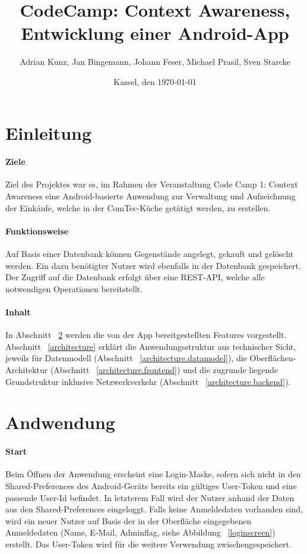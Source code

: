 \documentclass{scrartcl}
\begin{document}
	\title{CodeCamp: Context Awareness, Entwicklung einer Android-App}
	\author{Adrian Kunz, Jan Bingemann, Johann Feser, Michael Prasil, Sven Starcke}
	\date{Kassel, den \today}
	
	\maketitle
	\vspace*{10ex}
	\tableofcontents
	
	\newpage
	
	\section{Einleitung}
		\paragraph*{Ziele}
		Ziel des Projektes war es, im Rahmen der Veranstaltung \glqq Code Camp 1: Context Awareness\grqq{} eine Android-basierte Anwendung zur Verwaltung und Aufzeichnung der Einkäufe, welche in der ComTec-Küche getätigt werden, zu erstellen.
		
		\paragraph*{Funktionsweise}
		Auf Basis einer Datenbank können Gegenstände angelegt, gekauft und gelöscht werden. Ein dazu benötigter Nutzer wird ebenfalls in der Datenbank gespeichert. Der Zugriff auf die Datenbank erfolgt über eine REST-API, welche alle notwendigen Operationen bereitstellt.
		
		\paragraph*{Inhalt}
		In Abschnitt ~\ref{features} werden die von der App bereitgestellten Features vorgestellt. Abschnitt ~\ref{architecture} erklärt die Anwendungsstruktur aus technischer Sicht, jeweils für Datenmodell (Abschnitt ~\ref{architecture.datamodel}), die Oberflächen-Architektur (Abschnitt ~\ref{architecture.frontend}) und die zugrunde liegende Grundstruktur inklusive Netzwerkverkehr (Abschnitt ~\ref{architecture.backend}).
		
	\section{Andwendung} \label{features}
		\paragraph*{Start}
		Beim Öffnen der Anwendung erscheint eine Login-Maske, sofern sich nicht in den Shared-Preferences des Android-Geräts bereits ein gültiges User-Token und eine passende User-Id befindet. In letzterem Fall wird der Nutzer anhand der Daten aus den Shared-Preferences eingeloggt. Falls keine Anmeldedaten vorhanden sind, wird ein neuer Nutzer auf Basis der in der Oberfläche eingegebenen Anmeldedaten (Name, E-Mail, Adminflag, siehe Abbildung ~\ref{loginscreen}) erstellt. Das User-Token wird für die weitere Verwendung zwischengespeichert.
	
\end{document}
